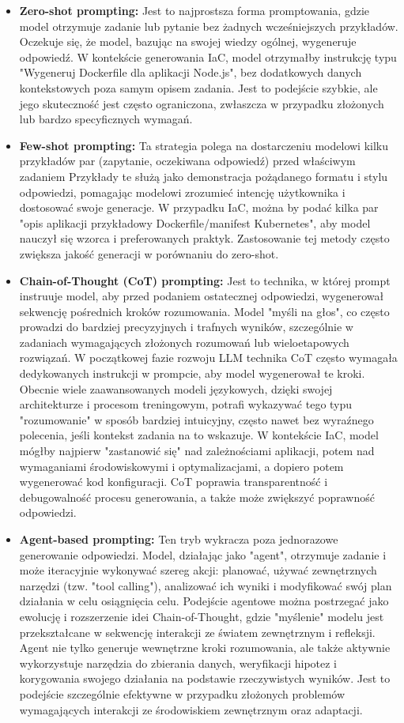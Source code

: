 \begin{itemize}
	\item \textbf{Zero-shot prompting:} Jest to najprostsza forma promptowania, gdzie model otrzymuje zadanie lub pytanie bez żadnych wcześniejszych przykładów. Oczekuje się, że model, bazując na swojej wiedzy ogólnej, wygeneruje odpowiedź. W kontekście generowania IaC, model otrzymałby instrukcję typu "Wygeneruj Dockerfile dla aplikacji Node.js", bez dodatkowych danych kontekstowych poza samym opisem zadania. Jest to podejście szybkie, ale jego skuteczność jest często ograniczona, zwłaszcza w przypadku złożonych lub bardzo specyficznych wymagań.
	\item \textbf{Few-shot prompting:} Ta strategia polega na dostarczeniu modelowi kilku przykładów par (zapytanie, oczekiwana odpowiedź) przed właściwym zadaniem \cite{brown_language_2020} Przykłady te służą jako demonstracja pożądanego formatu i stylu odpowiedzi, pomagając modelowi zrozumieć intencję użytkownika i dostosować swoje generacje. W przypadku IaC, można by podać kilka par "opis aplikacji \textrightarrow{} przykładowy Dockerfile/manifest Kubernetes", aby model nauczył się wzorca i preferowanych praktyk. Zastosowanie tej metody często zwiększa jakość generacji w porównaniu do zero-shot.
	\item \textbf{Chain-of-Thought (CoT) prompting:} Jest to technika, w której prompt instruuje model, aby przed podaniem ostatecznej odpowiedzi, wygenerował sekwencję pośrednich kroków rozumowania. Model "myśli na głos", co często prowadzi do bardziej precyzyjnych i trafnych wyników, szczególnie w zadaniach wymagających złożonych rozumowań lub wieloetapowych rozwiązań. W początkowej fazie rozwoju LLM technika CoT często wymagała dedykowanych instrukcji w prompcie, aby model wygenerował te kroki. Obecnie wiele zaawansowanych modeli językowych, dzięki swojej architekturze i procesom treningowym, potrafi wykazywać tego typu "rozumowanie" w sposób bardziej intuicyjny, często nawet bez wyraźnego polecenia, jeśli kontekst zadania na to wskazuje. W kontekście IaC, model mógłby najpierw "zastanowić się" nad zależnościami aplikacji, potem nad wymaganiami środowiskowymi i optymalizacjami, a dopiero potem wygenerować kod konfiguracji. CoT poprawia transparentność i debugowalność procesu generowania, a także może zwiększyć poprawność odpowiedzi.
	\item \textbf{Agent-based prompting:} Ten tryb wykracza poza jednorazowe generowanie odpowiedzi. Model, działając jako "agent", otrzymuje zadanie i może iteracyjnie wykonywać szereg akcji: planować, używać zewnętrznych narzędzi (tzw. "tool calling"), analizować ich wyniki i modyfikować swój plan działania w celu osiągnięcia celu. Podejście agentowe można postrzegać jako ewolucję i rozszerzenie idei Chain-of-Thought, gdzie "myślenie" modelu jest przekształcane w sekwencję interakcji ze światem zewnętrznym i refleksji. Agent nie tylko generuje wewnętrzne kroki rozumowania, ale także aktywnie wykorzystuje narzędzia do zbierania danych, weryfikacji hipotez i korygowania swojego działania na podstawie rzeczywistych wyników. Jest to podejście szczególnie efektywne w przypadku złożonych problemów wymagających interakcji ze środowiskiem zewnętrznym oraz adaptacji.
\end{itemize}


